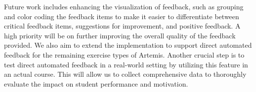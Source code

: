 \documentclass[manuscript,screen,review]{acmart}
\begin{document}
% 
Future work includes enhancing the visualization of feedback, such as grouping and color coding the feedback items to make it easier to differentiate between critical feedback items, suggestions for improvement, and positive feedback.
A high priority will be on further improving the overall quality of the feedback provided. 
We also aim to extend the implementation to support direct automated feedback for the remaining exercise types of Artemis.
Another crucial step is to test direct automated feedback in a real-world setting by utilizing this feature in an actual course. 
This will allow us to collect comprehensive data to thoroughly evaluate the impact on student performance and motivation.




\end{document}
